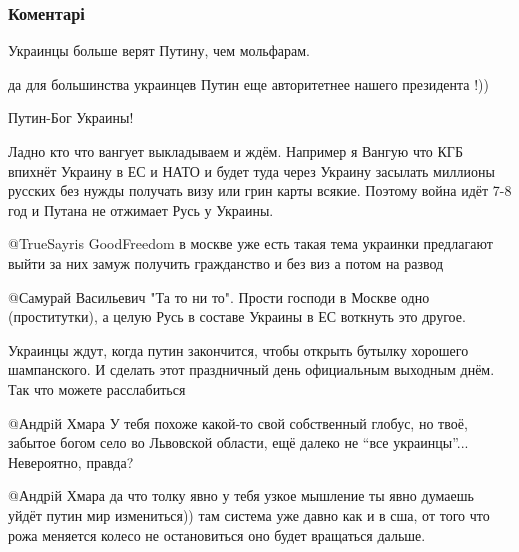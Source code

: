  
 
 
 
 
\subsubsection{Коментарі}

\begin{itemize} %
Украинцы больше верят Путину, чем мольфарам.

\begin{itemize} %
да для большинства украинцев Путин еще авторитетнее нашего президента !))

Путин-Бог Украины!


Ладно кто что вангует выкладываем и ждём. Например я Вангую что КГБ впихнёт
Украину в ЕС и НАТО и будет туда через Украину засылать миллионы русских без
нужды получать визу или грин карты всякие. Поэтому война идёт 7-8 год и Путана
не отжимает Русь у Украины.


 @TrueSayris GoodFreedom  в москве уже есть такая тема украинки предлагают
выйти за них замуж получить гражданство и без виз а потом на развод


@Самурай Васильевич  "Та то ни то". Прости господи в Москве одно
(проститутки), а целую Русь в составе Украины в ЕС воткнуть это другое.


Украинцы ждут, когда путин закончится, чтобы открыть бутылку хорошего
шампанского. И сделать этот праздничный день официальным выходным днём. Так что
можете расслабиться


@Андрiй Хмара  У тебя похоже какой-то свой собственный глобус, но твоё,
забытое богом село во Львовской области, ещё далеко не \enquote{все украинцы}...
Невероятно, правда?


@Андрiй Хмара  да что толку явно у тебя узкое мышление ты явно думаешь уйдёт
путин мир измениться)) там система уже давно как и в сша, от того что рожа
меняется колесо не остановиться оно будет вращаться дальше.


\end{itemize}
\end{itemize}
